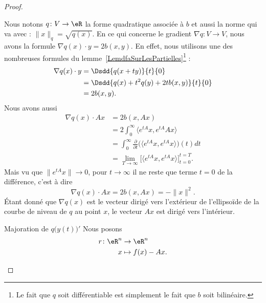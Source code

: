 \begin{proof}
\begin{subproof}
    Nous notons \( q\colon V\to \eR\) la forme quadratique associée à \( b\) et aussi la norme qui va avec : \( \| x \|_q=\sqrt{q(x)}\). En ce qui concerne le gradient \( \nabla q\colon V\to V\), nous avons la formule \( \nabla q(x)\cdot y=2b(x,y)\)\cite{MJEooXxBFFY}. En effet, nous utilisons une des nombreuses formules du lemme~\ref{LemdfaSurLesPartielles}\footnote{Le fait que \( q\) soit différentiable est simplement le fait que \( b\) soit bilinéaire.} :
    \begin{subequations}
        \begin{align}
            \nabla q(x)\cdot y&=\Dsdd{ q(x+ty) }{t}{0}\\
            &=\Dsdd{ q(x)+t^2q(y)+2tb(x,y) }{t}{0}\\
            &=2b(x,y).
        \end{align}
    \end{subequations}
    Nous avons aussi
    \begin{subequations}
        \begin{align}
            \nabla q(x)\cdot Ax&=2b(x,Ax)\\
            &=2\int_0^{\infty}\langle  e^{tA}x,  e^{tA}Ax\rangle \\
            &=\int_0^{\infty}\frac{ \partial  }{ \partial t }\Big( \langle  e^{tA}x,  e^{tA}x\rangle  \Big)(t)dt\\
            &=\lim_{T\to \infty} \Big[ \langle  e^{tA}x,  e^{tA}x\rangle  \Big]_{t=0}^{t=T}.
        \end{align}
    \end{subequations}
    Mais vu que \( \|  e^{tA}x \|\to 0\), pour \( t\to \infty\) il ne reste que terme \( t=0\) de la différence, c'est à dire
    \begin{equation}    \label{EqUCOGooEFxZSO}
        \nabla q(x)\cdot Ax=2b(x,Ax)=-\| x \|^2.
    \end{equation}
    Étant donné que \( \nabla q(x)\) est le vecteur dirigé vers l'extérieur de l'ellipsoïde de la courbe de niveau de \( q\) au point \( x\), le vecteur \( Ax\) est dirigé vers l'intérieur.

\begin{center}
   
\end{center}

\item[Majoration de \(  q\big( y(t) \big)'  \)]
    Nous posons
    \begin{equation}
        \begin{aligned}
            r\colon \eR^n&\to \eR^n \\
            x&\mapsto f(x)-Ax.
        \end{aligned}
    \end{equation}


\end{subproof}
\end{proof}
